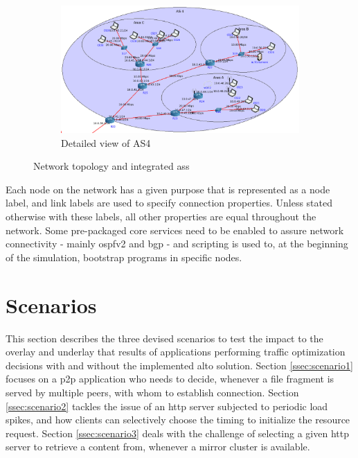     \begin{figure} \ContinuedFloat
    \begin{subfigure}[t]{\textwidth}
    \centering
    \includegraphics[scale=0.5]{img/topology-experiments-AS4.png}
    \caption{Detailed view of AS4}    
    \label{fig:exp-as4}
    \end{subfigure}

    \caption{Network topology and integrated \glspl{as}}
    \label{fig:exp-topology}
    \end{figure}


    Each node on the network has a given purpose that is represented as a node label, and link labels are used to specify connection properties.
    Unless stated otherwise with these labels, all other properties are equal throughout the network.
    Some pre-packaged \gls{core} services need to be enabled to assure network connectivity - mainly \gls{ospfv2} and \gls{bgp} - and scripting is used to, at the beginning of the simulation, bootstrap programs in specific nodes.

\section{Scenarios}

\label{sec:experiments-scenarios}

    This section describes the three devised scenarios to test the impact to the overlay and underlay that results of applications performing traffic optimization decisions with and without the implemented \gls{alto} solution.
    Section \ref{ssec:scenario1} focuses on a \gls{p2p} application who needs to decide, whenever a file fragment is served by multiple peers, with whom to establish connection.
    Section \ref{ssec:scenario2} tackles the issue of an \gls{http} server subjected to periodic load spikes, and how clients can selectively choose the timing to initialize the resource request.
    Section \ref{ssec:scenario3} deals with the challenge of selecting a given \gls{http} server to retrieve a content from, whenever a mirror cluster is available.

